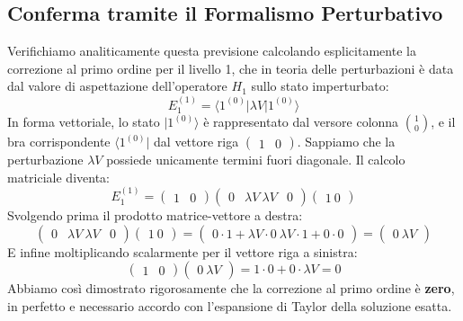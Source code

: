\subsection{Conferma tramite il Formalismo Perturbativo}
Verifichiamo analiticamente questa previsione calcolando esplicitamente la correzione al primo ordine per il livello 1, che in teoria delle perturbazioni è data dal valore di aspettazione dell'operatore $H_1$ sullo stato imperturbato:
\begin{equation}
E_1^{(1)} = \langle 1^{(0)} | \lambda V | 1^{(0)} \rangle
\end{equation}
In forma vettoriale, lo stato $\vert{}1^{(0)}\rangle$ è rappresentato dal versore colonna $\binom{1}{0}$, e il bra corrispondente $\langle 1^{(0)}\vert{}$ dal vettore riga $\begin{pmatrix} 1 & 0 \end{pmatrix}$. Sappiamo che la perturbazione $\lambda V$ possiede unicamente termini fuori diagonale. Il calcolo matriciale diventa:
\begin{equation}
E_1^{(1)} = \begin{pmatrix} 1 & 0 \end{pmatrix} \begin{pmatrix} 0 & \lambda V \ \lambda V & 0 \end{pmatrix} \begin{pmatrix} 1 \ 0 \end{pmatrix}
\end{equation}
Svolgendo prima il prodotto matrice-vettore a destra:
\begin{equation}
\begin{pmatrix} 0 & \lambda V \ \lambda V & 0 \end{pmatrix} \begin{pmatrix} 1 \ 0 \end{pmatrix} = \begin{pmatrix} 0 \cdot 1 + \lambda V \cdot 0 \ \lambda V \cdot 1 + 0 \cdot 0 \end{pmatrix} = \begin{pmatrix} 0 \ \lambda V \end{pmatrix}
\end{equation}
E infine moltiplicando scalarmente per il vettore riga a sinistra:
\begin{equation}
\begin{pmatrix} 1 & 0 \end{pmatrix} \begin{pmatrix} 0 \ \lambda V \end{pmatrix} = 1 \cdot 0 + 0 \cdot \lambda V = 0
\end{equation}
Abbiamo così dimostrato rigorosamente che la correzione al primo ordine è \textbf{zero}, in perfetto e necessario accordo con l'espansione di Taylor della soluzione esatta.

